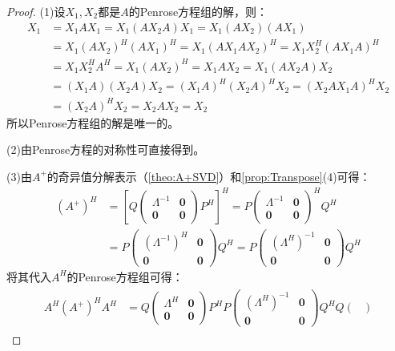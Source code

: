 \begin{proof}
	(1)设$X_1,X_2$都是$A$的Penrose方程组的解，则：
	\begin{align*}
		X_1
		&=X_1AX_1=X_1(AX_2A)X_1=X_1(AX_2)(AX_1) \\
		&=X_1(AX_2)^H(AX_1)^H=X_1(AX_1AX_2)^H=X_1X_2^H(AX_1A)^H \\
		&=X_1X_2^HA^H=X_1(AX_2)^H=X_1AX_2=X_1(AX_2A)X_2 \\
		&=(X_1A)(X_2A)X_2=(X_1A)^H(X_2A)^HX_2=(X_2AX_1A)^HX_2 \\
		&=(X_2A)^HX_2=X_2AX_2=X_2
	\end{align*}
	所以Penrose方程组的解是唯一的。\par
	(2)由Penrose方程的对称性可直接得到。\par
	(3)由$A^+$的奇异值分解表示（\cref{theo:A+SVD}）和\cref{prop:Transpose}(4)可得：
	\begin{align*}
		(A^+)^H&=\left[Q
		\begin{pmatrix}
			\varLambda^{-1} & \mathbf{0} \\
			\mathbf{0} & \mathbf{0}
		\end{pmatrix}P^H\right]^H
		=P
		\begin{pmatrix}
			\varLambda^{-1} & \mathbf{0} \\
			\mathbf{0} & \mathbf{0}
		\end{pmatrix}^HQ^H \\
		&=P
		\begin{pmatrix}
			(\varLambda^{-1})^H & \mathbf{0} \\
			\mathbf{0} & \mathbf{0}
		\end{pmatrix}Q^H
		=P
		\begin{pmatrix}
			(\varLambda^H)^{-1} & \mathbf{0} \\
			\mathbf{0} & \mathbf{0}
		\end{pmatrix}Q^H
	\end{align*}
	将其代入$A^H$的Penrose方程组可得：
	\begin{gather*}
		\begin{aligned}
			A^H(A^+)^HA^H
			&=Q
			\begin{pmatrix}
				\varLambda^H & \mathbf{0} \\
				\mathbf{0} & \mathbf{0}
			\end{pmatrix}
			P^HP
			\begin{pmatrix}
				(\varLambda^H)^{-1} & \mathbf{0} \\
				\mathbf{0} & \mathbf{0}
			\end{pmatrix}
			Q^HQ
			\begin{pmatrix}

\end{pmatrix}
\end{aligned}
\end{gather*}
\end{proof}
